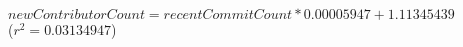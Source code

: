 $\mathit{newContributorCount} = \mathit{recentCommitCount} * 0.00005947 + 1.11345439$\\($r^2 = 0.03134947$)